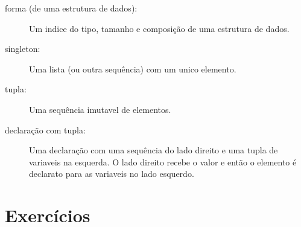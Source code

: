 \begin{description}
\item[forma (de uma estrutura de dados):] Um indice do tipo,
tamanho e composição de uma estrutura de dados.

\item[singleton:] Uma lista (ou outra sequência) com um unico elemento.

\item[tupla:] Uma sequência imutavel de elementos.

\item[declaração com tupla:] Uma declaração com uma sequência do 
lado direito e uma tupla de variaveis na esquerda. O lado direito
recebe o valor e então o elemento é declarato para as variaveis
no lado esquerdo.

\end{description}


\section{Exercícios}


